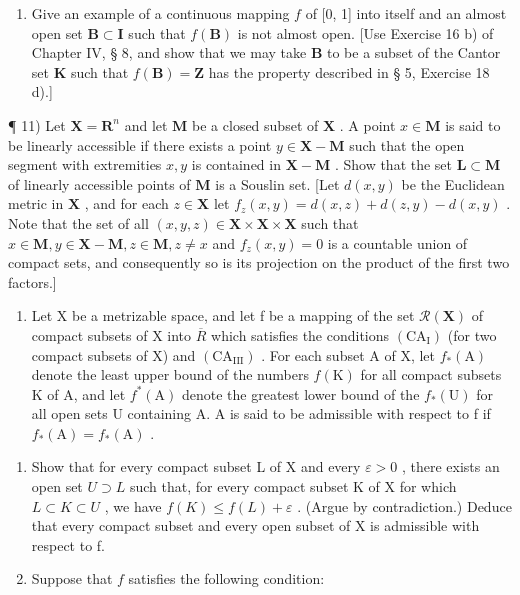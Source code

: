 \begin{enumerate}
\def\labelenumi{\alph{enumi})}
\setcounter{enumi}{1}
\tightlist
\item
  Give an example of a continuous mapping \(f\) of {[}0, 1{]} into itself and an almost open set \(\mathbf{B} \subset \mathbf{I}\) such that \(f(\mathbf{B})\) is not almost open. {[}Use Exercise 16 b) of Chapter IV, § 8, and show that we may take \(\mathbf{B}\) to be a subset of the Cantor set \(\mathbf{K}\) such that \(f(\mathbf{B}) = \mathbf{Z}\) has the property described in § 5, Exercise 18 d).{]}
\end{enumerate}

¶ 11) Let \(\mathbf{X} = \mathbf{R}^n\) and let \(\mathbf{M}\) be a closed subset of \(\mathbf{X}\) . A point \(x \in \mathbf{M}\) is said to be linearly accessible if there exists a point \(y \in \mathbf{X} - \mathbf{M}\) such that the open segment with extremities \(x, y\) is contained in \(\mathbf{X} - \mathbf{M}\) . Show that the set \(\mathbf{L} \subset \mathbf{M}\) of linearly accessible points of \(\mathbf{M}\) is a Souslin set. {[}Let \(d(x, y)\) be the Euclidean metric in \(\mathbf{X}\) , and for each \(z \in \mathbf{X}\) let \(f_z(x, y) = d(x, z) + d(z, y) - d(x, y)\) . Note that the set of all \((x, y, z) \in \mathbf{X} \times \mathbf{X} \times \mathbf{X}\) such that \(x \in \mathbf{M}, y \in \mathbf{X} - \mathbf{M}, z \in \mathbf{M}, z \neq x\) and \(f_z(x, y) = 0\) is a countable union of compact sets, and consequently so is its projection on the product of the first two factors.{]}

\begin{enumerate}
\def\labelenumi{\arabic{enumi})}
\setcounter{enumi}{11}
\tightlist
\item
  Let X be a metrizable space, and let f be a mapping of the set \(\mathcal{R}(\mathbf{X})\) of compact subsets of X into \(\overline{R}\) which satisfies the conditions \((\mathrm{CA}_{\mathrm{I}})\) (for two compact subsets of X) and \((\mathrm{CA}_{\mathrm{III}})\) . For each subset A of X, let \(f_{*}(\mathrm{A})\) denote the least upper bound of the numbers \(f(\mathrm{K})\) for all compact subsets K of A, and let \(f^{*}(\mathrm{A})\) denote the greatest lower bound of the \(f_{*}(\mathrm{U})\) for all open sets U containing A. A is said to be admissible with respect to f if \(f_{*}(\mathrm{A}) = f_{*}(\mathrm{A})\) .
\end{enumerate}

\begin{enumerate}
\def\labelenumi{\alph{enumi})}
\item
  Show that for every compact subset L of X and every \(\varepsilon > 0\) , there exists an open set \(U \supset L\) such that, for every compact subset K of X for which \(L \subset K \subset U\) , we have \(f(K) \leqslant f(L) + \varepsilon\) . (Argue by contradiction.) Deduce that every compact subset and every open subset of X is admissible with respect to f.
\item
  Suppose that \(f\) satisfies the following condition:
\end{enumerate}


